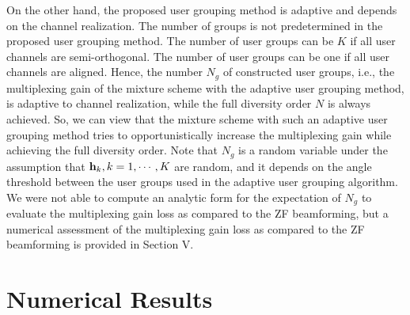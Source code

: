 \documentclass[11pt, draft, onecolumn ]{IEEEtran}
\begin{document}
On the other hand, the proposed user grouping method is adaptive and depends on the channel realization. The number of groups is not predetermined in the proposed user grouping method. The number of user groups can  be $K$ if all user channels are semi-orthogonal. The number of user groups can be one if all user channels are aligned.  Hence, the number $N_g$ of constructed user groups, i.e., the multiplexing gain of the mixture scheme with the adaptive user grouping method,  is adaptive to channel realization, while the full diversity order $N$ is always achieved.  So, we can view that the mixture scheme with such an adaptive user grouping method tries to opportunistically  increase the multiplexing gain while achieving the full diversity order.  Note that $N_g$ is a random variable under the assumption that ${\bf h}_k,k=1,\cdots,K$ are random, and it depends on the angle threshold between the user groups used in the adaptive user grouping algorithm. We were not able to compute an analytic form for the expectation of $N_g$ to evaluate the multiplexing gain loss as compared to the ZF beamforming, but a numerical assessment of the multiplexing gain loss as compared to the ZF beamforming is provided in Section V.








\section{Numerical Results}
\label{sec:NumericalResult}
\end{document}
